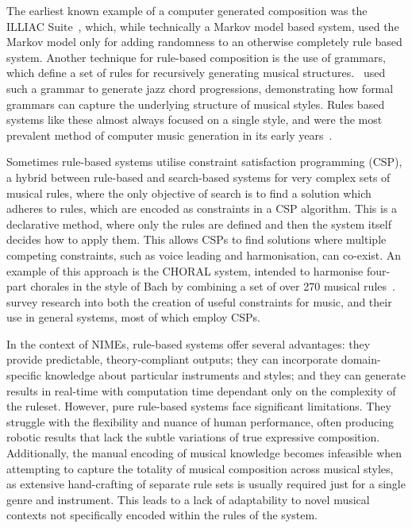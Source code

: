 The earliest known example of a computer generated composition was the ILLIAC Suite~\citep{Hiller1959ILLIAC}, which, while technically a Markov model based system, used the Markov model only for adding randomness to an otherwise completely rule based system. Another technique for rule-based composition is the use of grammars, which define a set of rules for recursively generating musical structures.~\cite{Steedman1984JazzGrammar} used such a grammar to generate jazz chord progressions, demonstrating how formal grammars can capture the underlying structure of musical styles. Rules based systems like these almost always focused on a single style, and were the most prevalent method of computer music generation in its early years~\citep{Moorer1972ComputerMusic}.

Sometimes rule-based systems utilise constraint satisfaction programming (CSP), a hybrid between rule-based and search-based systems for very complex sets of musical rules, where the only objective of search is to find a solution which adheres to rules, which are encoded as constraints in a CSP algorithm. This is a declarative method, where only the rules are defined and then the system itself decides how to apply them. This allows CSPs to find solutions where multiple competing constraints, such as voice leading and harmonisation, can co-exist. An example of this approach is the CHORAL system, intended to harmonise four-part chorales in the style of Bach by combining a set of over 270 musical rules~\citep{Ebicoglu1988CHORAL}.~\cite{Anders2011ConstraintSurvey} survey research into both the creation of useful constraints for music, and their use in general systems, most of which employ CSPs.

In the context of NIMEs, rule-based systems offer several advantages: they provide predictable, theory-compliant outputs; they can incorporate domain-specific knowledge about particular instruments and styles; and they can generate results in real-time with computation time dependant only on the complexity of the ruleset. However, pure rule-based systems face significant limitations. They struggle with the flexibility and nuance of human performance, often producing robotic results that lack the subtle variations of true expressive composition. Additionally, the manual encoding of musical knowledge becomes infeasible when attempting to capture the totality of musical composition across musical styles, as extensive hand-crafting of separate rule sets is usually required just for a single genre and instrument. This leads to a lack of adaptability to novel musical contexts not specifically encoded within the rules of the system.

